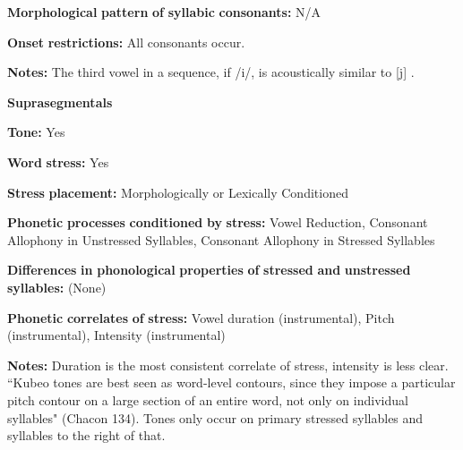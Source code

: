 \begin{styleBody}
\textbf{Morphological} \textbf{pattern} \textbf{of} \textbf{syllabic} \textbf{consonants:} N/A
\end{styleBody}

\begin{styleBody}
\textbf{Onset} \textbf{restrictions:} All consonants occur.
\end{styleBody}

\begin{styleBody}
\textbf{Notes:} The third vowel in a sequence, if /i/, is acoustically similar to [j] \citep[52]{Chacon2012}.
\end{styleBody}

\begin{styleBody}
\textbf{Suprasegmentals}
\end{styleBody}

\begin{styleBody}
\textbf{Tone:} Yes
\end{styleBody}

\begin{styleBody}
\textbf{Word} \textbf{stress:} Yes
\end{styleBody}

\begin{styleBody}
\textbf{Stress} \textbf{placement:} Morphologically or Lexically Conditioned
\end{styleBody}

\begin{styleBody}
\textbf{Phonetic} \textbf{processes} \textbf{conditioned} \textbf{by} \textbf{stress:} Vowel Reduction, Consonant Allophony in Unstressed Syllables, Consonant Allophony in Stressed Syllables
\end{styleBody}

\begin{styleBody}
\textbf{Differences} \textbf{in} \textbf{phonological} \textbf{properties} \textbf{of} \textbf{stressed} \textbf{and} \textbf{unstressed} \textbf{syllables:} (None)
\end{styleBody}

\begin{styleBody}
\textbf{Phonetic} \textbf{correlates} \textbf{of} \textbf{stress:} Vowel duration (instrumental), Pitch (instrumental), Intensity (instrumental)
\end{styleBody}

\begin{styleBody}
\textbf{Notes:} Duration is the most consistent correlate of stress, intensity is less clear. “Kubeo tones are best seen as word-level contours, since they impose a particular pitch contour on a large section of an entire word, not only on individual syllables" (Chacon 134). Tones only occur on primary stressed syllables and syllables to the right of that.
\end{styleBody}

